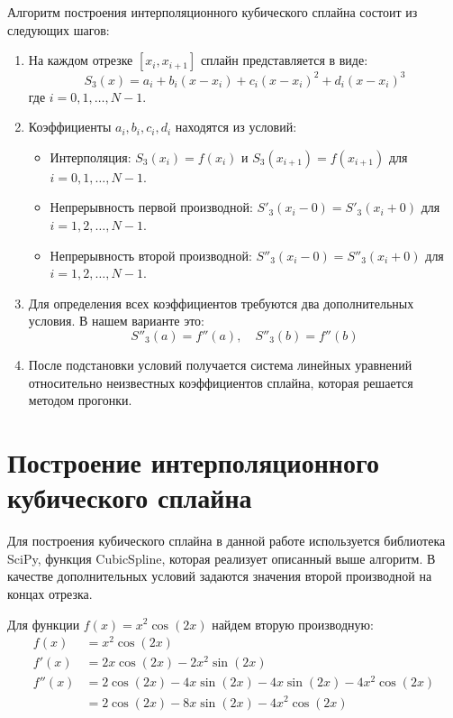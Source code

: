 \documentclass[12pt]{article}
\begin{document}
Алгоритм построения интерполяционного кубического сплайна состоит из следующих шагов:

\begin{enumerate}
    \item На каждом отрезке $[x_i, x_{i+1}]$ сплайн представляется в виде:
    \begin{equation}
        S_3(x) = a_i + b_i(x-x_i) + c_i(x-x_i)^2 + d_i(x-x_i)^3
    \end{equation}
    где $i = 0, 1, \ldots, N-1$.
    
    \item Коэффициенты $a_i, b_i, c_i, d_i$ находятся из условий:
    \begin{itemize}
        \item Интерполяция: $S_3(x_i) = f(x_i)$ и $S_3(x_{i+1}) = f(x_{i+1})$ для $i = 0, 1, \ldots, N-1$.
        \item Непрерывность первой производной: $S'_3(x_i-0) = S'_3(x_i+0)$ для $i = 1, 2, \ldots, N-1$.
        \item Непрерывность второй производной: $S''_3(x_i-0) = S''_3(x_i+0)$ для $i = 1, 2, \ldots, N-1$.
    \end{itemize}

    \item Для определения всех коэффициентов требуются два дополнительных условия. В нашем варианте это:
    \begin{equation}
        S''_3(a) = f''(a), \quad S''_3(b) = f''(b)
    \end{equation}

    \item После подстановки условий получается система линейных уравнений относительно неизвестных коэффициентов сплайна, которая решается методом прогонки.
\end{enumerate}

\section{Построение интерполяционного кубического сплайна}

Для построения кубического сплайна в данной работе используется библиотека SciPy, функция CubicSpline, которая реализует описанный выше алгоритм. В качестве дополнительных условий задаются значения второй производной на концах отрезка.

Для функции $f(x) = x^2 \cos(2x)$ найдем вторую производную:
\begin{align}
f(x) &= x^2 \cos(2x) \\
f'(x) &= 2x\cos(2x) - 2x^2\sin(2x) \\
f''(x) &= 2\cos(2x) - 4x\sin(2x) - 4x\sin(2x) - 4x^2\cos(2x) \\
&= 2\cos(2x) - 8x\sin(2x) - 4x^2\cos(2x)
\end{align}
\end{document}
